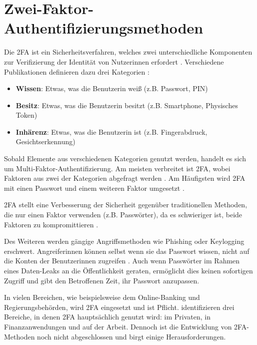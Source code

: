 \chapter{Zwei-Faktor-Authentifizierungsmethoden}

Die \ac{2FA} ist ein Sicherheitsverfahren, welches zwei unterschiedliche Komponenten zur Verifizierung der Identität von Nutzerinnen erfordert \parencite{decristofaroComparativeUsability2014}. Verschiedene Publikationen definieren dazu drei Kategorien \parencite{decristofaroComparativeUsability2014, yuEfficientGeneric2014, singhMultifactorAuthentication2017}:
\begin{itemize}
  \item \textbf{Wissen}: Etwas, was die Benutzerin weiß (z.B. Passwort, PIN)
  \item \textbf{Besitz}: Etwas, was die Benutzerin besitzt (z.B. Smartphone, Physisches Token)
  \item \textbf{Inhärenz}: Etwas, was die Benutzerin ist (z.B. Fingerabdruck, Gesichtserkennung)
\end{itemize}
Sobald Elemente aus verschiedenen Kategorien genutzt werden, handelt es sich um Multi-Faktor-Authentifizierung. Am meisten verbreitet ist \ac{2FA}, wobei Faktoren aus zwei der Kategorien abgefragt werden \parencite{decristofaroComparativeUsability2014}. Am Häufigsten wird \ac{2FA} mit einen Passwort und einem weiteren Faktor umgesetzt \parencite{decristofaroComparativeUsability2014}.

\pskip
\ac{2FA} stellt eine Verbesserung der Sicherheit gegenüber traditionellen Methoden, die nur einen Faktor verwenden (z.B. Passwörter), da es schwieriger ist, beide Faktoren zu kompromittieren \parencite{dasguptaMultiFactorAuthentication2017}.

Des Weiteren werden gängige Angriffsmethoden wie Phishing oder Keylogging erschwert. Angreiferinnen können selbst wenn sie das Passwort wissen, nicht auf die Konten der Benutzerinnen zugreifen \parencite{dasguptaMultiFactorAuthentication2017}. Auch wenn Passwörter im Rahmen eines Daten-Leaks an die Öffentlichkeit geraten, ermöglicht dies keinen sofortigen Zugriff und gibt den Betroffenen Zeit, ihr Passwort anzupassen.

\pskip
In vielen Bereichen, wie beispielsweise dem Online-Banking und Regierungsbehörden, wird \ac{2FA} eingesetzt und ist Pflicht. \textcite{decristofaroComparativeUsability2014} identifizieren drei Bereiche, in denen \ac{2FA} hauptsächlich genutzt wird: im Privaten, in Finanzanwendungen und auf der Arbeit. Dennoch ist die Entwicklung von \ac{2FA}-Methoden noch nicht abgeschlossen und birgt einige Herausforderungen.

